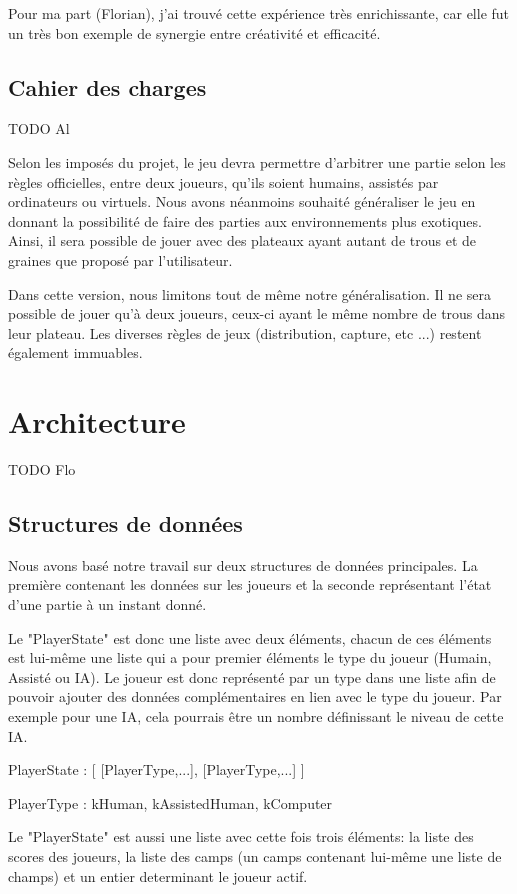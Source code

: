 \documentclass[]{article}
\begin{document}
Pour ma part (Florian), j'ai trouvé cette expérience très enrichissante, car elle fut un très bon exemple de synergie entre créativité et efficacité.

\subsection{Cahier des charges}

TODO Al

Selon les imposés du projet, le jeu devra permettre d'arbitrer une partie selon les règles officielles, entre deux joueurs, qu'ils soient humains, assistés par ordinateurs ou virtuels. Nous avons néanmoins souhaité généraliser le jeu en donnant la possibilité de faire des parties aux environnements plus exotiques. Ainsi, il sera possible de jouer avec des plateaux ayant autant de trous et de graines que proposé par l'utilisateur. 

Dans cette version, nous limitons tout de même notre généralisation. Il ne sera possible de jouer qu'à deux joueurs, ceux-ci ayant le même nombre de trous dans leur plateau. Les diverses règles de jeux (distribution, capture, etc ...) restent également immuables.

\section{Architecture}

TODO Flo
\subsection{Structures de données}

	Nous avons basé notre travail sur deux structures de données principales. La première contenant les données sur les joueurs et la seconde représentant l'état d'une partie à un instant donné.

Le "PlayerState" est donc une liste avec deux éléments, chacun de ces éléments est lui-même une liste qui a pour premier éléments le type du joueur (Humain, Assisté ou IA).
Le joueur est donc représenté par un type dans une liste afin de pouvoir ajouter des données complémentaires en lien avec le type du joueur. Par exemple pour une IA, cela pourrais être un nombre définissant le niveau de cette IA.

PlayerState : 
[
	[PlayerType,...],
	[PlayerType,...]
]

PlayerType :
kHuman, kAssistedHuman, kComputer

Le "PlayerState" est aussi une liste avec cette fois trois éléments: la liste des scores des joueurs, la liste des camps (un camps contenant lui-même une liste de champs) et un entier determinant le joueur actif.
\end{document}
